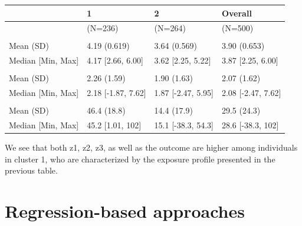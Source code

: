 \documentclass[
]{book}
\begin{document}
\begin{tabular}[t]{llll}
\toprule
  & 1 & 2 & Overall\\
\midrule
 & (N=236) & (N=264) & (N=500)\\
\addlinespace[0.3em]
\multicolumn{4}{l}{\textbf{Outcome}}\\
\hspace{1em}Mean (SD) & 4.19 (0.619) & 3.64 (0.569) & 3.90 (0.653)\\
\hspace{1em}Median [Min, Max] & 4.17 [2.66, 6.00] & 3.62 [2.25, 5.22] & 3.87 [2.25, 6.00]\\
\addlinespace[0.3em]
\multicolumn{4}{l}{\textbf{Poverty index}}\\
\hspace{1em}Mean (SD) & 2.26 (1.59) & 1.90 (1.63) & 2.07 (1.62)\\
\hspace{1em}Median [Min, Max] & 2.18 [-1.87, 7.62] & 1.87 [-2.47, 5.95] & 2.08 [-2.47, 7.62]\\
\addlinespace[0.3em]
\multicolumn{4}{l}{\textbf{Age}}\\
\hspace{1em}Mean (SD) & 46.4 (18.8) & 14.4 (17.9) & 29.5 (24.3)\\
\hspace{1em}Median [Min, Max] & 45.2 [1.01, 102] & 15.1 [-38.3, 54.3] & 28.6 [-38.3, 102]\\
\bottomrule
\end{tabular}

We see that both z1, z2, z3, as well as the outcome are higher among individuals in cluster 1, who are characterized by the exposure profile presented in the previous table.

\hypertarget{regression-based-approaches}{%
\chapter{Regression-based approaches}\label{regression-based-approaches}}
\end{document}
